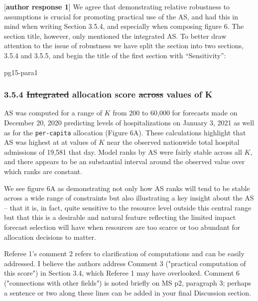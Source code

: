 \documentclass{article}
\providecommand{\DIFaddtex}[1]{{\protect\color{blue}\uwave{#1}}} %
\providecommand{\DIFdeltex}[1]{{\protect\color{red}\sout{#1}}}                      %
\providecommand{\DIFaddbegin}{} %
\providecommand{\DIFaddend}{} %
\providecommand{\DIFdelbegin}{} %
\providecommand{\DIFdelend}{} %
\providecommand{\DIFadd}[1]{\texorpdfstring{\DIFaddtex{#1}}{#1}} %
\providecommand{\DIFdel}[1]{\texorpdfstring{\DIFdeltex{#1}}{}} %
\newcommand{\DIFscaledelfig}{0.5}
\newlength{\DIFdelgraphicswidth} %
\newlength{\DIFdelgraphicsheight} %
\newcommand{\DIFaddincludegraphics}[2][]{{\color{blue}\fbox{\DIFOincludegraphics[#1]{#2}}}} %
\newcommand{\DIFdelincludegraphics}[2][]{%
\sbox{\DIFdelgraphicsbox}{\DIFOincludegraphics[#1]{#2}}%
\settoboxwidth{\DIFdelgraphicswidth}{\DIFdelgraphicsbox} %
\settoboxtotalheight{\DIFdelgraphicsheight}{\DIFdelgraphicsbox} %
\scalebox{\DIFscaledelfig}{%
\parbox[b]{\DIFdelgraphicswidth}{\usebox{\DIFdelgraphicsbox}\\[-\baselineskip] \rule{\DIFdelgraphicswidth}{0em}}\llap{\resizebox{\DIFdelgraphicswidth}{\DIFdelgraphicsheight}{%
\setlength{\unitlength}{\DIFdelgraphicswidth}%
\begin{picture}(1,1)%
\thicklines\linethickness{2pt} %
{\color[rgb]{1,0,0}\put(0,0){\framebox(1,1){}}}%
{\color[rgb]{1,0,0}\put(0,0){\line( 1,1){1}}}%
{\color[rgb]{1,0,0}\put(0,1){\line(1,-1){1}}}%
\end{picture}%
}\hspace*{3pt}}} %
} %
\DeclareRobustCommand{\DIFaddbegin}{\DIFOaddbegin \let\includegraphics\DIFaddincludegraphics} %
\DeclareRobustCommand{\DIFaddend}{\DIFOaddend \let\includegraphics\DIFOincludegraphics} %
\DeclareRobustCommand{\DIFdelbegin}{\DIFOdelbegin \let\includegraphics\DIFdelincludegraphics} %
\DeclareRobustCommand{\DIFdelend}{\DIFOaddend \let\includegraphics\DIFOincludegraphics} %
\begin{document}
[\textbf{author response 1}] We agree that demonstrating relative robustness to assumptions is crucial for promoting practical use of the AS, and had this in mind when writing
Section 3.5.4, and especially when composing figure 6.  The section title, however, only mentioned the integrated AS. To better draw attention to
the issue of robustness we have split the section into two sections, 3.5.4 and 3.5.5,
and begin the title of the first section with ``Sensitivity'':

\begin{mybox}{pg15-para1}
  \subsubsection*{3.5.4 \quad \DIFdelbegin \DIFdel{Integrated }\DIFdelend \DIFaddbegin \DIFadd{Sensitivity of }\DIFaddend allocation score \DIFdelbegin \DIFdel{across }\DIFdelend \DIFaddbegin \DIFadd{to }\DIFaddend values of K}
  \DIFdelbegin %
  \DIFdelend \DIFaddbegin \label{sec:sensitivity}
  \DIFaddend 
AS was computed for a range of $K$ from 200 to 60,000 \DIFaddbegin \DIFadd{at increments of 200 }\DIFaddend for forecasts made on December 20, 2020 predicting levels of
hospitalizations on January 3, 2021 as well as for the \texttt{per-capita} allocation (Figure 6A). These
calculations highlight that AS was highest at at values of $K$ near the observed nationwide total hospital admissions of
19,581 that day. Model ranks by AS were fairly stable across all $K$, and there appears
to be an substantial interval around the observed value over which ranks are constant.

\end{mybox}

We see figure 6A as demonstrating not only how AS ranks will tend to be stable across a wide range of constraints but 
also illustrating a key insight about the AS -- that it is,
in fact, quite sensitive to the resource level outside this central range but that this is a desirable and
natural feature reflecting the limited impact forecast selection will have when
resources are too scarce or too abundant for allocation decisions to matter.


\begin{quotebar}
Referee 1's comment 2 refers to clarification of computations and
can be easily addressed.  I believe the authors address Comment 3
("practical computation of this score") in Section 3.4, which Referee 1
may have overlooked.  Comment 6 ("connections with other fields") is
noted briefly on MS p2, paragraph 3; perhaps a sentence or two along
these lines can be added in your final Discussion section.
\end{quotebar}
\end{document}
